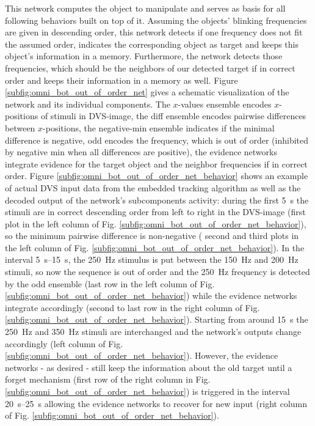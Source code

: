 This network computes the object to manipulate and serves as basis for all following behaviors built on top of it. 
Assuming the objects' blinking frequencies are given in descending order, this network detects if one frequency does not fit the assumed order, indicates the corresponding object as target and keeps this object's information in a memory. 
Furthermore, the network detects those frequencies, which should be the neighbors of our detected target if in correct order and keeps their information in a memory as well.
Figure \ref{subfig:omni_bot_out_of_order_net} gives a schematic visualization of the network and its individual components.
The $x$-values ensemble encodes $x$-positions of stimuli in \ac{DVS}-image, the diff ensemble encodes pairwise differences between $x$-positions, the negative-min ensemble indicates if the minimal difference is negative, odd encodes the frequency, which is out of order (inhibited by negative min when all differences are positive), the evidence networks integrate evidence for the target object and the neighbor frequencies if in correct order.
Figure \ref{subfig:omni_bot_out_of_order_net_behavior} shows an example of actual \ac{DVS} input data from the embedded tracking algorithm as well as the decoded output of the network’s subcomponents activity: during the first \SI{5}{\second} the stimuli are in correct descending order from left to right in the \ac{DVS}-image (first plot in the left column of Fig. \ref{subfig:omni_bot_out_of_order_net_behavior}), so the minimum pairwise difference is non-negative ( second and third
plots in the left column of Fig. \ref{subfig:omni_bot_out_of_order_net_behavior}). 
In the interval \SIrange{5}{15}{\second}, the \SI{250}{\hertz} stimulus is put between the \SI{150}{\hertz} and \SI{200}{\hertz} stimuli, so now the sequence is out of order and the \SI{250}{\hertz} frequency is detected by the odd ensemble (last row in the left column of Fig. \ref{subfig:omni_bot_out_of_order_net_behavior}) while the evidence networks integrate accordingly (second to last row in the right column of Fig. \ref{subfig:omni_bot_out_of_order_net_behavior}). 
Starting from around \SI{15}{\second} the \SI{250}{\hertz} and \SI{350}{\hertz} stimuli are interchanged and the network's outputs change accordingly (left column of Fig. \ref{subfig:omni_bot_out_of_order_net_behavior}).
However, the evidence networks - as desired - still keep the information about the old target until a forget mechanism (first row of the right column in Fig. \ref{subfig:omni_bot_out_of_order_net_behavior}) is triggered in the interval \SIrange{20}{25}{\second} allowing the evidence networks to recover for new input (right column of Fig. \ref{subfig:omni_bot_out_of_order_net_behavior}).

